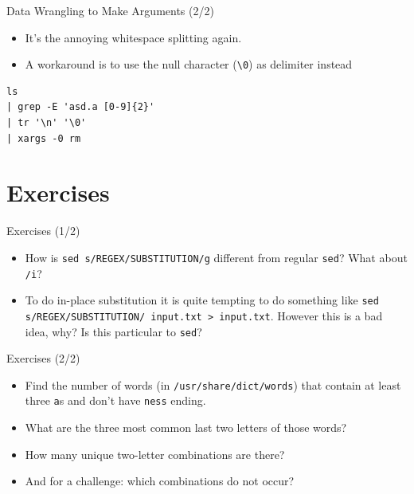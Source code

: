 \documentclass[12pt]{beamer}
\begin{document}
\begin{frame}[fragile]{Data Wrangling to Make Arguments (2/2)}
  \begin{itemize}
    \item It's the annoying whitespace splitting again.
    \item A workaround is to use the null character (\texttt{\textbackslash 0}) as delimiter instead
  \end{itemize}
  \begin{verbatim}
ls
| grep -E 'asd.a [0-9]{2}'
| tr '\n' '\0'
| xargs -0 rm
  \end{verbatim}
\end{frame}

\section{Exercises}
\begin{frame}{Exercises (1/2)}
  \begin{itemize}
    \item How is \texttt{sed s/REGEX/SUBSTITUTION/g} different from regular \texttt{sed}? What about \texttt{/i}?
    \item To do in-place substitution it is quite tempting to do something like \texttt{sed s/REGEX/SUBSTITUTION/ input.txt > input.txt}. However this is a bad idea, why? Is this particular to \texttt{sed}?
  \end{itemize}
\end{frame}

\begin{frame}{Exercises (2/2)}
  \begin{itemize}
    \item Find the number of words (in \texttt{/usr/share/dict/words}) that contain at least three \texttt{a}s and don’t have \texttt{ness} ending.
    \item What are the three most common last two letters of those words?
    \item How many unique two-letter combinations are there?
    \item And for a challenge: which combinations do not occur?
  \end{itemize}
\end{frame}
\end{document}
